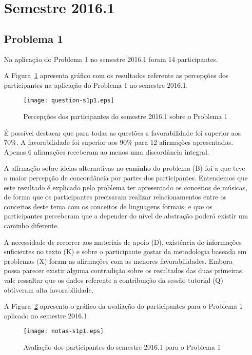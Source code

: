 \section{Semestre 2016.1}
\label{sec-sem-2016}
\subsection{Problema 1}
Na aplicação do Problema 1 no semestre 2016.1 foram 14 participantes.

A Figura~\ref{percep-s1p1} apresenta gráfico com os resultados referente
as percepções dos participantes na aplicação do
Problema 1 no semestre 2016.1.
\begin{figure}[!htb]
\centering
\texttt{[image: question-s1p1.eps]}
\caption{Percepções dos participantes do semestre 2016.1 sobre o Problema 1}
\label{percep-s1p1}
\end{figure}

É possível destacar que para todas as questões a favorabilidade
foi superior aos $70\%$. A favorabilidade foi superior aos $90\%$
para 12 afirmações apresentadas.
Apenas 6 afirmações receberam ao menos uma discordância integral.

A afirmação sobre ideias alternativas no caminho do problema (B)
foi a que teve a maior percepção de concordância por partes dos
participantes.
Entendemos que este resultado é explicado pelo problema
ter apresentado os conceitos de músicas, de forma que
os participantes precisaram realizar relacionamentos entre
os conceitos deste tema com os conceitos de linguagens
formais, e que os participantes perceberam que a depender do
nível de abstração poderá existir um caminho diferente.

A necessidade de recorrer aos materiais de apoio (D),
existência de informações suficientes no texto (K) e
sobre o participante gostar da metodologia baseada
em problemas (X) foram as afirmações com
as menores favorabilidades.
Embora possa parecer existir alguma contradição
sobre os resultados das duas primeiras, vale
ressaltar que os dados referente
a contribuição da sessão tutorial (Q) obtiveram
alta favorabilidade.

A Figura~\ref{aval-s1p1} apresenta o gráfico da
avaliação do participantes para o Problema 1 aplicado no semestre 2016.1.

\begin{figure}[!htb]
\centering
\texttt{[image: notas-s1p1.eps]}
\caption{Avaliação dos participantes do semestre 2016.1 para o Problema 1}
\label{aval-s1p1}
\end{figure}

